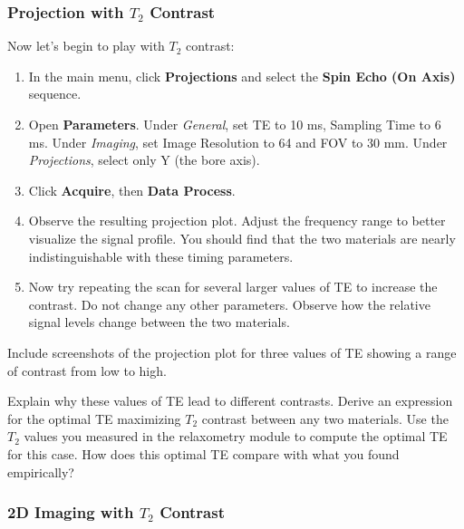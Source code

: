 \subsubsection{Projection with $T_2$ Contrast} \label{sec:proj-T2}

Now let's begin to play with $T_2$ contrast:

\begin{enumerate}
    \item   In the main menu, click \textbf{Projections} and select the \textbf{Spin Echo (On Axis)} sequence.
    \item   Open \textbf{Parameters}. Under \emph{General}, set TE to 10 ms, Sampling Time to 6 ms. Under \emph{Imaging}, set Image Resolution to 64 and FOV to 30 mm. Under \emph{Projections}, select only Y (the bore axis).
    \item   Click \textbf{Acquire}, then \textbf{Data Process}.
    \item   Observe the resulting projection plot. Adjust the frequency range to better visualize the signal profile. You should find that the two materials are nearly indistinguishable with these timing parameters.
    \item   Now try repeating the scan for several larger values of TE to increase the contrast. Do not change any other parameters. Observe how the relative signal levels change between the two materials.
\end{enumerate}

\color{red} \noindent
Include screenshots of the projection plot for three values of TE showing a range of contrast from low to high.
\color{black}
\vspace{5mm}

\color{red}
\noindent
Explain why these values of TE lead to different contrasts. Derive an expression for the optimal TE maximizing $T_2$ contrast between any two materials. Use the $T_2$ values you measured in the relaxometry module to compute the optimal TE for this case. How does this optimal TE compare with what you found empirically?
\color{black}

\subsubsection{2D Imaging with $T_2$ Contrast} \label{sec:2d-T2}

